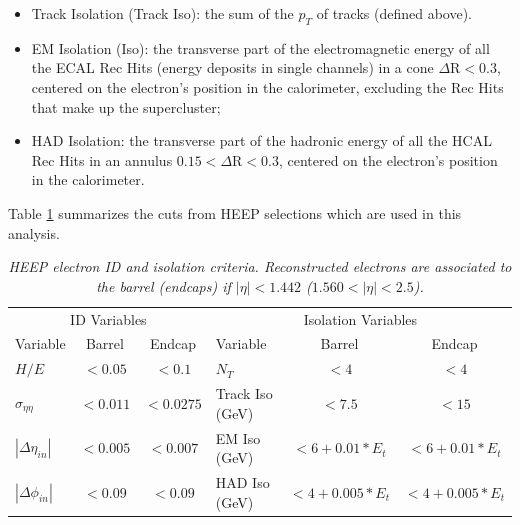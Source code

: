 \documentclass{cmspaper}
\begin{document}
\begin{linenumbers}
\begin{itemize}
%
\item Track Isolation (Track Iso): the sum of the $p_{T}$ of tracks (defined above).
%
%
\item EM Isolation (Iso): the transverse part of the electromagnetic energy 
of all the ECAL Rec Hits (energy deposits in single channels)
in a cone $\Delta\mbox{R} < 0.3$, 
centered on the electron's position in the calorimeter, excluding the Rec Hits that make up the supercluster;
%
\item HAD Isolation: the transverse part of the hadronic energy of all the HCAL Rec Hits in an annulus
$0.15 < \Delta\mbox{R} < 0.3$, centered on the electron's position in the calorimeter. 
%
\end{itemize}

Table \ref{tab:HEEPselection} 
summarizes the cuts from HEEP selections which are 
used in this analysis. 

\begin{table}[htbp]
  \label{tab:HEEPselection}
  \begin{center}
    \begin{tabular}{|lcc|lcc|} \hline
      \multicolumn{3}{|c|}{ID Variables} & \multicolumn{3}{|c|}{Isolation Variables} \\ 
      Variable & Barrel & Endcap & Variable & Barrel & Endcap  \\ \hline
      $H/E$  & $<0.05$ & $<0.1$ & $N_T$  & $<4$ & $<4$ \\ \hline
      $\sigma_{\eta\eta}$  & $<0.011$ & $<0.0275$ & Track Iso (GeV) & $<7.5$ & $<15$ \\ \hline
      $|\Delta\eta_{in}|$  & $<0.005$ & $<0.007$ & EM Iso (GeV) & $<6+0.01*E_{t}$ & $<6+0.01*E_{t}$ \\ \hline
      $|\Delta\phi_{in}|$  & $<0.09$ & $<0.09$ & HAD Iso (GeV) & $<4+0.005*E_{t}$ & $<4+0.005*E_{t}$ \\ \hline
    \end{tabular}
  \caption{\small \sl HEEP electron ID and isolation criteria. Reconstructed electrons are associated to the 
    barrel (endcaps) if $|\eta|<1.442$ ($1.560<|\eta|<2.5$).}
  \end{center}
\end{table}


\end{linenumbers}
\end{document}
